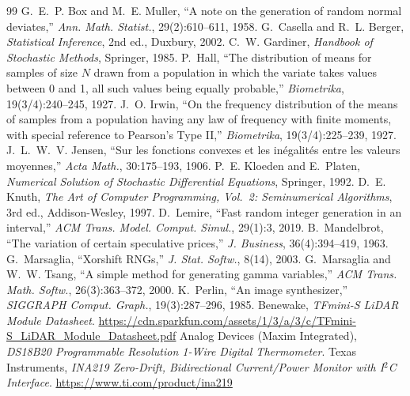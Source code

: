 \documentclass[10pt,a4paper]{article}
\theoremstyle{definition}
\theoremstyle{remark}
\begin{document}
\begin{thebibliography}{99}\small
{} G.~E.~P. Box and M.~E. Muller, ``A note on the generation of random
normal deviates,'' \emph{Ann. Math. Statist.}, 29(2):610--611, 1958.
 G.~Casella and R.~L. Berger, \emph{Statistical Inference}, 2nd ed.,
Duxbury, 2002.
 C.~W. Gardiner, \emph{Handbook of Stochastic Methods}, Springer, 1985.
 P.~Hall, ``The distribution of means for samples of size $N$ drawn from a
population in which the variate takes values between 0 and 1, all such values being equally
probable,'' \emph{Biometrika}, 19(3/4):240--245, 1927.
 J.~O. Irwin, ``On the frequency distribution of the means of samples from a
population having any law of frequency with finite moments, with special reference to
Pearson's Type II,'' \emph{Biometrika}, 19(3/4):225--239, 1927.
 J.~L.~W.~V. Jensen, ``Sur les fonctions convexes et les in\'egalit\'es
entre les valeurs moyennes,'' \emph{Acta Math.}, 30:175--193, 1906.
 P.~E. Kloeden and E.~Platen, \emph{Numerical Solution of Stochastic
Differential Equations}, Springer, 1992.
 D.~E. Knuth, \emph{The Art of Computer Programming, Vol.~2: Seminumerical
Algorithms}, 3rd ed., Addison-Wesley, 1997.
 D.~Lemire, ``Fast random integer generation in an interval,''
\emph{ACM Trans. Model. Comput. Simul.}, 29(1):3, 2019.
 B.~Mandelbrot, ``The variation of certain speculative prices,''
\emph{J. Business}, 36(4):394--419, 1963.
 G.~Marsaglia, ``Xorshift RNGs,'' \emph{J. Stat. Softw.}, 8(14), 2003.
 G.~Marsaglia and W.~W. Tsang, ``A simple method for generating gamma
variables,'' \emph{ACM Trans. Math. Softw.}, 26(3):363--372, 2000.
 K.~Perlin, ``An image synthesizer,'' \emph{SIGGRAPH Comput. Graph.},
19(3):287--296, 1985.
 Benewake, \emph{TFmini-S LiDAR Module Datasheet}.
\url{https://cdn.sparkfun.com/assets/1/3/a/3/c/TFmini-S_LiDAR_Module_Datasheet.pdf}
 Analog Devices (Maxim Integrated), \emph{DS18B20 Programmable Resolution
1-Wire Digital Thermometer}.
 Texas Instruments, \emph{INA219 Zero-Drift, Bidirectional Current/Power
Monitor with I$^2$C Interface}. \url{https://www.ti.com/product/ina219}
\end{thebibliography}
\end{document}
